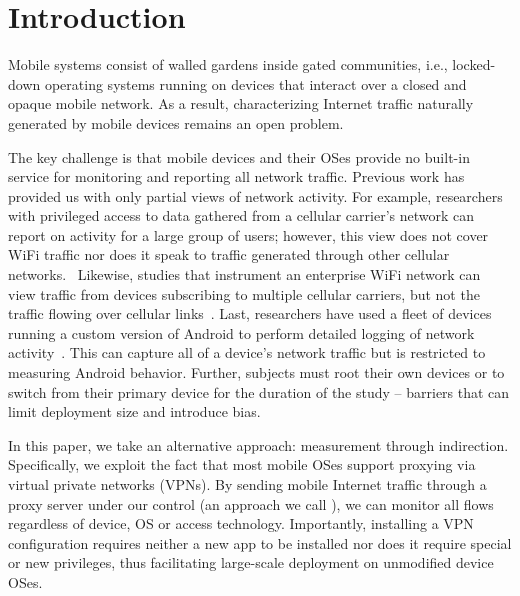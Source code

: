 \section{Introduction}
\label{sec:introduction}


Mobile systems consist of walled gardens inside gated communities, i.e., locked-down operating 
systems running on devices that interact over a closed and opaque mobile network. As a result, 
characterizing Internet traffic naturally generated by mobile devices remains an open problem. 

The key challenge is that mobile devices and their OSes provide no built-in service for monitoring and 
reporting all network traffic. Previous work has provided us with only partial views of network activity. 
For example, researchers with privileged access to data gathered from a cellular carrier's network can 
report on activity for a large group of users; however, this view does not cover WiFi traffic nor 
does it speak to traffic generated through other cellular networks.~\cite{anyattstudy} Likewise, studies that instrument 
an enterprise WiFi network can view traffic from devices subscribing to multiple cellular carriers, but not 
the traffic flowing over cellular links~\cite{someonedidthis}. Last, researchers have used a fleet of devices running a 
custom version of Android to perform detailed logging of network activity~\cite{mobilelab}. This can capture all of a device's network 
traffic but is restricted to measuring Android behavior. Further, subjects must root their own devices or to 
switch from their primary device for the duration of the study -- barriers that can limit deployment 
size and introduce bias. 

In this paper, we take an alternative approach: measurement through indirection. Specifically, 
we exploit the fact that most mobile OSes support proxying via virtual private networks (VPNs). 
By sending mobile Internet traffic through a proxy server under our control (an approach we call \platname), we can monitor all 
flows regardless of device, OS or access technology. Importantly, installing a VPN configuration 
requires neither a new app to be installed nor does it require special or new privileges, thus facilitating 
large-scale deployment on unmodified device OSes.

